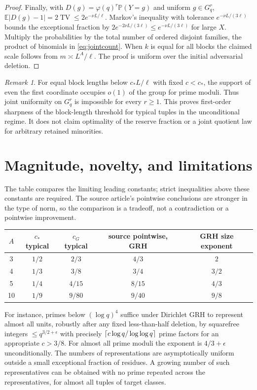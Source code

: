 \documentclass[11pt]{article}
\theoremstyle{remark}\newtheorem{remark}[theorem]{Remark}
\newcommand{\E}{\mathbb E}\newcommand{\Pp}{\mathbb P}\newcommand{\Z}{\mathbb Z}
\newcommand{\TV}{\operatorname{TV}}\newcommand{\abs}[1]{\lvert#1\rvert}
\begin{document}
\begin{proof}
Finally, with $D(g)=\varphi(q)^r\Pp(Y=g)$ and uniform $g\in G_q^r$, $\E|D(g)-1|=2\TV\le2e^{-\nu L/\ell}$. Markov's inequality with tolerance $e^{-\nu L/(3\ell)}$ bounds the exceptional fraction by $2e^{-2\nu L/(3\ell)}\le e^{-\nu L/(3\ell)}$ for large $X$. Multiply the probabilities by the total number of ordered disjoint families, the product of binomials in \eqref{eq:jointcount}. When $k$ is equal for all blocks the claimed scale follows from $m\asymp L^A/\ell$. The proof is uniform over the initial adversarial deletion.
\end{proof}
\begin{remark}
For equal block lengths below $c_* L/\ell$ with fixed $c<c_*$, the support of even the first coordinate occupies $o(1)$ of the group for prime moduli. Thus joint uniformity on $G_q^r$ is impossible for every $r\ge1$. This proves first-order sharpness of the block-length threshold for typical tuples in the unconditional regime. It does not claim optimality of the reserve fraction or a joint quotient law for arbitrary retained minorities.
\end{remark}

\section{Magnitude, novelty, and limitations}
The table compares the limiting leading constants; strict inequalities above these constants are required. The source article's pointwise conclusions are stronger in the type of norm, so the comparison is a tradeoff, not a contradiction or a pointwise improvement.
\begin{center}
\begin{tabular}{ccccc}
\toprule
$A$ & $c_*$ typical & $c_G$ typical & source pointwise, GRH & GRH size exponent\\
\midrule
3 & $1/2$ & $2/3$ & $4/3$ & $2$\\
4 & $1/3$ & $3/8$ & $3/4$ & $3/2$\\
5 & $1/4$ & $4/15$ & $8/15$ & $4/3$\\
10 & $1/9$ & $9/80$ & $9/40$ & $9/8$\\
\bottomrule
\end{tabular}
\end{center}
For instance, primes below $(\log q)^4$ suffice under Dirichlet GRH to represent almost all units, robustly after any fixed less-than-half deletion, by squarefree integers $\le q^{3/2+\epsilon}$ with precisely $\lceil c\log q/\log\log q\rceil$ prime factors for an appropriate $c>3/8$. For almost all prime moduli the exponent is $4/3+\epsilon$ unconditionally. The numbers of representations are asymptotically uniform outside a small exceptional fraction of residues. A growing number of such representatives can be obtained with no prime repeated across the representatives, for almost all tuples of target classes.
\end{document}
